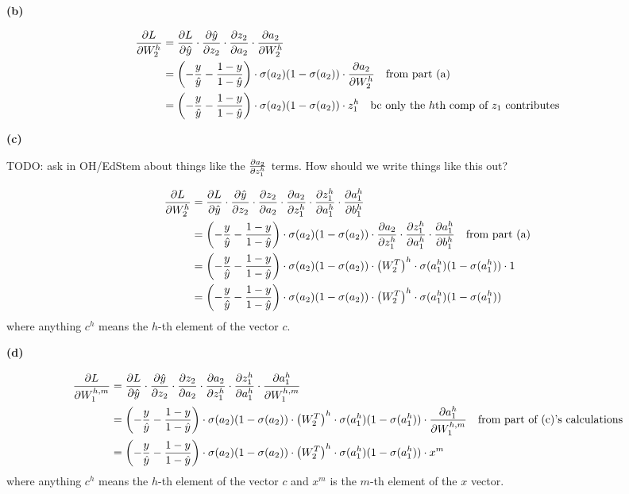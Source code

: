 \documentclass[submit]{harvardml}
\renewcommand{\part}[1] {\vspace{.10in} {\bf (#1)}}
\begin{document}
\part{b}

\begin{align*}
  \pdv{L}{W_2^h} &= \pdv{L}{\hat{y}}\cdot\pdv{\hat{y}}{z_2}\cdot\pdv{z_2}{a_2}\cdot\pdv{a_2}{W_2^h} \\
  &= \left(-\frac{y}{\hat{y}}-\frac{1-y}{1-\hat{y}} \right)\cdot \sigma(a_2)(1-\sigma(a_2)) \cdot\pdv{a_2}{W_2^h} \quad \text{from part (a)} \\
  &= \left(-\frac{y}{\hat{y}}-\frac{1-y}{1-\hat{y}} \right)\cdot \sigma(a_2)(1-\sigma(a_2)) \cdot z_1^h \quad \text{bc only the $h$th comp of $z_1$ contributes}
\end{align*}

\part{c}

TODO: ask in OH/EdStem about things like the $\pdv{a_2}{z_1^h}$ terms. How should we write things like this out?

\begin{align*}
  \pdv{L}{W_2^h} &= \pdv{L}{\hat{y}}\cdot\pdv{\hat{y}}{z_2}\cdot\pdv{z_2}{a_2}\cdot\pdv{a_2}{z_1^h}\cdot\pdv{z_1^h}{a_1^h}\cdot\pdv{a_1^h}{b_1^h} \\
  &= \left(-\frac{y}{\hat{y}}-\frac{1-y}{1-\hat{y}} \right)\cdot \sigma(a_2)(1-\sigma(a_2)) \cdot\pdv{a_2}{z_1^h}\cdot\pdv{z_1^h}{a_1^h}\cdot\pdv{a_1^h}{b_1^h} \quad \text{from part (a)} \\
  &= \left(-\frac{y}{\hat{y}}-\frac{1-y}{1-\hat{y}} \right)\cdot \sigma(a_2)(1-\sigma(a_2)) \cdot \left(W_2^T\right)^h \cdot \sigma(a_1^h)(1-\sigma(a_1^h)) \cdot 1 \\
  &= \left(-\frac{y}{\hat{y}}-\frac{1-y}{1-\hat{y}} \right)\cdot \sigma(a_2)(1-\sigma(a_2)) \cdot \left(W_2^T\right)^h \cdot \sigma(a_1^h)(1-\sigma(a_1^h))
\end{align*}
where anything $c^h$ means the $h$-th element of the vector $c$.

\part{d}

\begin{align*}
  \pdv{L}{W_1^{h,m}} &= \pdv{L}{\hat{y}}\cdot\pdv{\hat{y}}{z_2}\cdot\pdv{z_2}{a_2}\cdot\pdv{a_2}{z_1^h}\cdot\pdv{z_1^h}{a_1^h}\cdot\pdv{a_1^h}{W_1^{h,m}} \\
  &= \left(-\frac{y}{\hat{y}}-\frac{1-y}{1-\hat{y}} \right)\cdot \sigma(a_2)(1-\sigma(a_2)) \cdot \left(W_2^T\right)^h \cdot \sigma(a_1^h)(1-\sigma(a_1^h)) \cdot \pdv{a_1^h}{W_1^{h,m}} \quad \text{from part of (c)'s calculations} \\
  &= \left(-\frac{y}{\hat{y}}-\frac{1-y}{1-\hat{y}} \right)\cdot \sigma(a_2)(1-\sigma(a_2)) \cdot \left(W_2^T\right)^h \cdot \sigma(a_1^h)(1-\sigma(a_1^h)) \cdot x^m
\end{align*}
where anything $c^h$ means the $h$-th element of the vector $c$ and $x^m$ is the $m$-th element of the $x$ vector.
\end{document}
